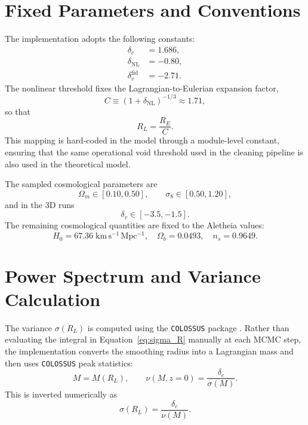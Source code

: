 \documentclass[12pt]{report}
\begin{document}
\section{Fixed Parameters and Conventions}

The implementation adopts the following constants:
\begin{align}
    \delta_c &= 1.686,\\
    \delta_\mathrm{NL} &= -0.80,\\
    \delta_v^\mathrm{fid} &= -2.71.
\end{align}
The nonlinear threshold fixes the Lagrangian-to-Eulerian expansion factor,
\begin{equation}
    C \equiv (1+\delta_\mathrm{NL})^{-1/3} \approx 1.71,
\end{equation}
so that
\begin{equation}
    R_L = \frac{R_E}{C}.
\end{equation}
This mapping is hard-coded in the model through a module-level constant, ensuring that the same operational void threshold used in the cleaning pipeline is also used in the theoretical model.

The sampled cosmological parameters are
\begin{equation}
    \Omega_m \in [0.10,0.50], \qquad \sigma_8 \in [0.50,1.20],
\end{equation}
and in the 3D runs
\begin{equation}
    \delta_v \in [-3.5,-1.5].
\end{equation}
The remaining cosmological quantities are fixed to the Aletheia values:
\begin{equation}
    H_0 = 67.36\;\mathrm{km\,s^{-1}\,Mpc^{-1}}, \quad
    \Omega_b = 0.0493, \quad
    n_s = 0.9649.
\end{equation}

\section{Power Spectrum and Variance Calculation}
\label{app:vdn_power}

The variance $\sigma(R_L)$ is computed using the \texttt{COLOSSUS} package \citep{Diemer2018}. Rather than evaluating the integral in Equation~\ref{eq:sigma_R} manually at each MCMC step, the implementation converts the smoothing radius into a Lagrangian mass and then uses \texttt{COLOSSUS} peak statistics:
\begin{equation}
    M = M(R_L), \qquad \nu(M,z=0) = \frac{\delta_c}{\sigma(M)}.
\end{equation}
This is inverted numerically as
\begin{equation}
    \sigma(R_L) = \frac{\delta_c}{\nu(M)}.
\end{equation}
\end{document}
